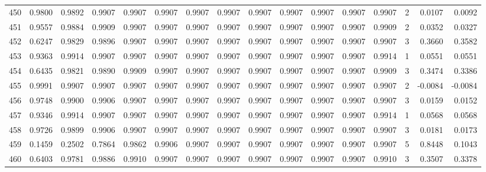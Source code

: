 \begin{tabular}{lrrrrrrrrrrrrrrr}
450 &      0.9800 &  0.9892 &  0.9907 &  0.9907 &  0.9907 &  0.9907 &  0.9907 &  0.9907 &  0.9907 &  0.9907 &   0.9907 &     0.9907 &      2 &                    0.0107 &                     0.0092 \\
451 &      0.9557 &  0.9884 &  0.9909 &  0.9907 &  0.9907 &  0.9907 &  0.9907 &  0.9907 &  0.9907 &  0.9907 &   0.9907 &     0.9909 &      2 &                    0.0352 &                     0.0327 \\
452 &      0.6247 &  0.9829 &  0.9896 &  0.9907 &  0.9907 &  0.9907 &  0.9907 &  0.9907 &  0.9907 &  0.9907 &   0.9907 &     0.9907 &      3 &                    0.3660 &                     0.3582 \\
453 &      0.9363 &  0.9914 &  0.9907 &  0.9907 &  0.9907 &  0.9907 &  0.9907 &  0.9907 &  0.9907 &  0.9907 &   0.9907 &     0.9914 &      1 &                    0.0551 &                     0.0551 \\
454 &      0.6435 &  0.9821 &  0.9890 &  0.9909 &  0.9907 &  0.9907 &  0.9907 &  0.9907 &  0.9907 &  0.9907 &   0.9907 &     0.9909 &      3 &                    0.3474 &                     0.3386 \\
455 &      0.9991 &  0.9907 &  0.9907 &  0.9907 &  0.9907 &  0.9907 &  0.9907 &  0.9907 &  0.9907 &  0.9907 &   0.9907 &     0.9907 &      2 &                   -0.0084 &                    -0.0084 \\
456 &      0.9748 &  0.9900 &  0.9906 &  0.9907 &  0.9907 &  0.9907 &  0.9907 &  0.9907 &  0.9907 &  0.9907 &   0.9907 &     0.9907 &      3 &                    0.0159 &                     0.0152 \\
457 &      0.9346 &  0.9914 &  0.9907 &  0.9907 &  0.9907 &  0.9907 &  0.9907 &  0.9907 &  0.9907 &  0.9907 &   0.9907 &     0.9914 &      1 &                    0.0568 &                     0.0568 \\
458 &      0.9726 &  0.9899 &  0.9906 &  0.9907 &  0.9907 &  0.9907 &  0.9907 &  0.9907 &  0.9907 &  0.9907 &   0.9907 &     0.9907 &      3 &                    0.0181 &                     0.0173 \\
459 &      0.1459 &  0.2502 &  0.7864 &  0.9862 &  0.9906 &  0.9907 &  0.9907 &  0.9907 &  0.9907 &  0.9907 &   0.9907 &     0.9907 &      5 &                    0.8448 &                     0.1043 \\
460 &      0.6403 &  0.9781 &  0.9886 &  0.9910 &  0.9907 &  0.9907 &  0.9907 &  0.9907 &  0.9907 &  0.9907 &   0.9907 &     0.9910 &      3 &                    0.3507 &                     0.3378 \\

\end{tabular}
